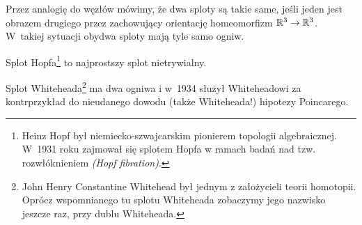 Przez analogię do węzłów mówimy, że dwa sploty są takie same, jeśli jeden jest obrazem drugiego przez zachowujący orientację homeomorfizm $\mathbb R^3 \to \mathbb R^3$.
W~takiej sytuacji obydwa sploty mają tyle samo ogniw.

\begin{example}
%
%
    Splot Hopfa\footnote{Heinz Hopf był niemiecko-szwajcarskim pionierem topologii algebraicznej. W~1931 roku zajmował się splotem Hopfa w ramach badań nad tzw. rozwłóknieniem \emph{(Hopf fibration)}.} to najprostszy splot nietrywialny.
\end{example}

\begin{example}
%
%
    Splot Whiteheada\footnote{John Henry Constantine Whitehead był jednym z założycieli teorii homotopii. Oprócz wspomnianego tu splotu Whiteheada zobaczymy jego nazwisko jeszcze raz, przy dublu Whiteheada.} ma dwa ogniwa i w~1934 służył Whiteheadowi za kontrprzykład do nieudanego dowodu (także Whiteheada!) hipotezy Poincarego.
\end{example}

